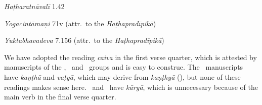 \begin{ekdosis}



\begin{testimonia}[hp02_031]
\emph{Haṭharatnāvalī} 1.42

\begin{versinnote}
\end{versinnote}

\emph{Yogacintāmaṇi} 71v (attr.~to the \emph{Haṭhapradīpikā})

\begin{versinnote}
\end{versinnote}

\emph{Yuktabhavadeva} 7.156 (attr.~to the \emph{Haṭhapradīpikā})

\begin{versinnote}
\end{versinnote}

\end{testimonia}

\begin{philcomm}[hp02_031]
We have adopted the reading \emph{caiva} in the first verse quarter, which is attested by manuscripts of the \textbeta, \textgamma\ and \textdelta\ groups and is easy to construe. The \textalpha\ manuscripts have \emph{kaṇṭhā} and \emph{vaṭyā}, which may derive from \emph{kaṇṭhyā} (\epsilonOne), but none of these readings makes sense here. \etaOne\ and \etaTwo\ have \emph{kāryā}, which is unnecessary because of the main verb in the final verse quarter.


\end{philcomm}
\end{ekdosis}
